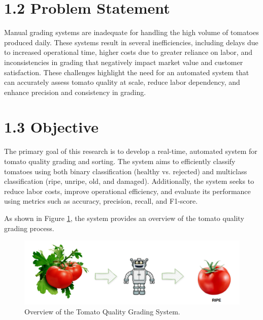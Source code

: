 \documentclass[12pt,a4paper]{report}
\begin{document}
	
\section*{1.2 Problem Statement}
\hspace{1cm}Manual grading systems are inadequate for handling the high volume of tomatoes produced daily. These systems result in several inefficiencies, including delays due to increased operational time, higher costs due to greater reliance on labor, and inconsistencies in grading that negatively impact market value and customer satisfaction. These challenges highlight the need for an automated system that can accurately assess tomato quality at scale, reduce labor dependency, and enhance precision and consistency in grading.
	
	\section*{1.3 Objective}
\hspace{1cm}The primary goal of this research is to develop a real-time, automated system for tomato quality grading and sorting. The system aims to efficiently classify tomatoes using both binary classification (healthy vs. rejected) and multiclass classification (ripe, unripe, old, and damaged). Additionally, the system seeks to reduce labor costs, improve operational efficiency, and evaluate its performance using metrics such as accuracy, precision, recall, and F1-score. 

As shown in Figure \ref{fig:tomato_quality_system}, the system provides an overview of the tomato quality grading process.


\begin{figure}[htbp]
	\renewcommand\thefigure{1.1}
	\centering
	\includegraphics[width=1\textwidth]{DOC/obj.png}
	\caption{Overview of the Tomato Quality Grading System. }
	\label{fig:tomato_quality_system}
\end{figure}
\end{document}
